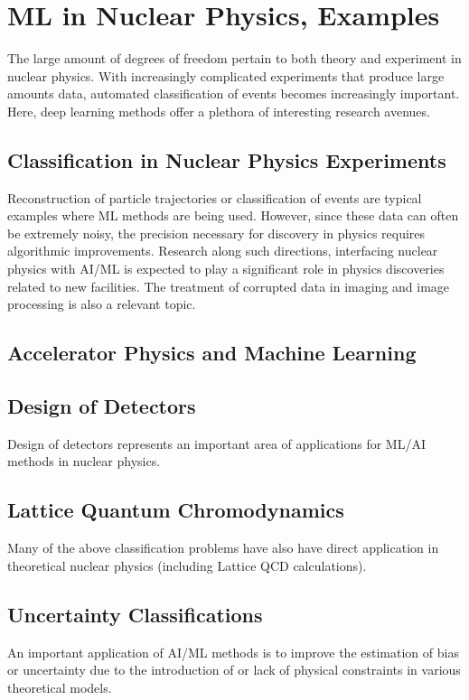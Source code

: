 \documentclass[%
oneside,                 %
final,                   %
10pt]{article}
\begin{document}
\section{ML in Nuclear Physics, Examples}

The large amount of degrees of freedom pertain to both theory and experiment in nuclear physics. With increasingly complicated experiments that produce large amounts data, automated classification of events becomes increasingly important. Here, deep learning methods offer a plethora of interesting research avenues. 

\subsection{Classification in Nuclear Physics Experiments}
Reconstruction of particle trajectories or classification of events are typical examples where ML methods are being used. However, since these data can often be extremely noisy, the precision necessary for discovery in physics requires algorithmic improvements. Research along such directions, interfacing nuclear physics with AI/ML is expected to play a significant role in physics discoveries related to new facilities.  The treatment of corrupted data in imaging and image processing is also a relevant topic. 

\subsection{Accelerator Physics and Machine Learning}

\subsection{Design of Detectors}
Design of detectors represents an important area of applications for ML/AI methods in nuclear physics.

\subsection{Lattice Quantum Chromodynamics}
Many of the above classification problems have also have direct application in theoretical nuclear physics (including Lattice QCD calculations).

\subsection{Uncertainty Classifications}
An important application of AI/ML methods is to improve the estimation of bias or uncertainty due to the introduction of or lack of physical constraints in various theoretical models.
\end{document}
